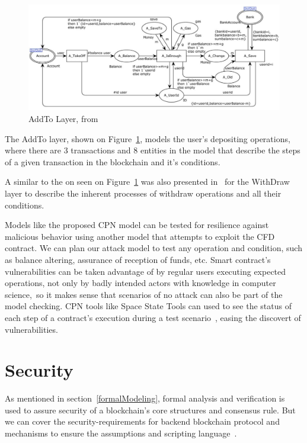 \documentclass[sigconf, nonacm]{acmart}
\begin{document}
\begin{figure}[h]
  \centering
  \includegraphics[width=\linewidth]{add-to-layer}
  \caption{AddTo Layer, from \cite{Liu2019}}
  \label{fig:add-to-layer}
\end{figure}

The AddTo layer, shown on Figure~\ref{fig:add-to-layer}, models the user's depositing operations, where there are 
3 transactions and 8 entities in the model that describe the steps of a given transaction in the blockchain and it's conditions.

A similar to the on seen on Figure~\ref{fig:add-to-layer} was also presented in~\cite{Liu2019} for the WithDraw layer to describe the inherent processes
of withdraw operations and all their conditions.

Models like the proposed CPN model can be tested for resilience against malicious behavior using another model that attempts to exploit
the CFD contract. We can plan our attack model to test any operation and condition, such as balance altering, assurance of reception of funds,
etc. Smart contract's vulnerabilities can be taken advantage of by regular users executing expected operations, not only by badly intended actors 
with knowledge in computer science,~so it makes sense that scenarios of no attack can also be part of the model checking. 
CPN tools like Space State Tools can used to see the status of each step of a contract's execution during a test scenario~\cite{Liu2019},
easing the discovert of vulnerabilities.

\section{Security}\label{security}
As mentioned in section~\ref{formalModeling}, formal analysis and verification is used to assure security of a blockchain's core structures and consensus rule.
But we can cover the security-requirements for backend blockchain protocol and mechanisms to ensure the assumptions and scripting language~\cite{Matsuo2017}.
\end{document}
